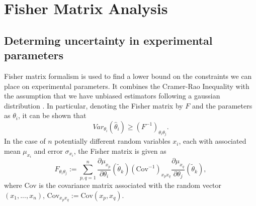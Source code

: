 \documentclass[11pt]{article} %
\newcommand{\br}[1]{\ensuremath{\left( #1 \right)}}
\begin{document}
\section{Fisher Matrix Analysis} \label{sec:fisher}
\subsection{Determing uncertainty in experimental parameters}

Fisher matrix formalism is used to find a lower bound on the constraints we can place on experimental parameters. It combines the Cramer-Rao Inequality \cite{casella2002statistical} with the assumption that we have unbiased estimators  following a gaussian distribution \cite{dodelson2020modern}. In particular, denoting the Fisher matrix by $F$ and the parameters as $\theta_i$, it can be shown that
\begin{equation}
    Var_{\theta_i}(\hat\theta_i) \geq \br{F^{-1}}_{\theta_i\theta_j}.
\end{equation}
In the case of $n$ potentially different random variables $x_i$, each with associated mean $\mu_{x_i}$ and error $\sigma_{x_i}$, the Fisher matrix is given as
\begin{equation}
    F_{\theta_i\theta_j} := \sum_{p, q=1}^n \frac{\partial\mu_{x_p}}{\partial\theta_i}(\tilde\theta_k)(\text{Cov}^{-1})_{x_px_q}\frac{\partial\mu_{x_q}}{\partial\theta_j}(\tilde\theta_k),
\end{equation}
where Cov is the covariance matrix associated with the random vector $(x_1, ..., x_n)$, $\text{Cov}_{x_px_q}:=\text{Cov}(x_p,x_q)$.



\end{document}
